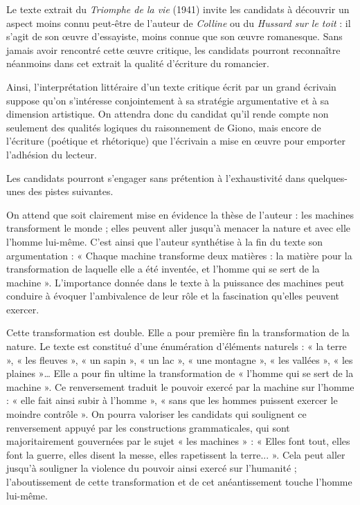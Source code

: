 		{Le texte extrait du \emph{Triomphe de la vie} (1941) invite les candidats à découvrir un
aspect moins connu peut-être de l’auteur de \emph{Colline} ou du \emph{Hussard sur le toit} : il s’agit
de son œuvre d’essayiste, moins connue que son œuvre romanesque. Sans jamais
avoir rencontré cette œuvre critique, les candidats pourront reconnaître néanmoins
dans cet extrait la qualité d’écriture du romancier.

Ainsi, l’interprétation littéraire d’un texte critique écrit par un grand écrivain suppose
qu’on s’intéresse conjointement à sa stratégie argumentative et à sa dimension
artistique. On attendra donc du candidat qu’il rende compte non seulement des
qualités logiques du raisonnement de Giono, mais encore de l’écriture (poétique et
rhétorique) que l’écrivain a mise en œuvre pour emporter l’adhésion du lecteur.

Les candidats pourront s’engager sans prétention à l’exhaustivité dans quelques-
unes des pistes suivantes.

On attend que soit clairement mise en évidence la thèse de l’auteur : les machines
transforment le monde ; elles peuvent aller jusqu’à menacer la nature et avec elle
l’homme lui-même. C’est ainsi que l’auteur synthétise à la fin du texte son
argumentation : « Chaque machine transforme deux matières : la matière pour la
transformation de laquelle elle a été inventée, et l’homme qui se sert de la machine ».
L’importance donnée dans le texte à la puissance des machines peut conduire à
évoquer l’ambivalence de leur rôle et la fascination qu’elles peuvent exercer.

Cette transformation est double. Elle a pour première fin la transformation de la
nature. Le texte est constitué d’une énumération d’éléments naturels : « la terre »,
« les fleuves », « un sapin », « un lac », « une montagne », « les vallées », « les
plaines »… Elle a pour fin ultime la transformation de « l’homme qui se sert de la
machine ». Ce renversement traduit le pouvoir exercé par la machine sur l’homme :
« elle fait ainsi subir à l’homme », « sans que les hommes puissent exercer le moindre
contrôle ». On pourra valoriser les candidats qui soulignent ce renversement appuyé
par les constructions grammaticales, qui sont majoritairement gouvernées par le sujet
« les machines » : « Elles font tout, elles font la guerre, elles disent la messe, elles
rapetissent la terre... ». Cela peut aller jusqu’à souligner la violence du pouvoir ainsi
exercé sur l’humanité ; l’aboutissement de cette transformation et de cet
anéantissement touche l’homme lui-même.

}
